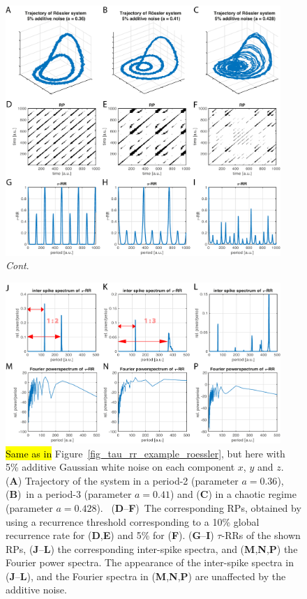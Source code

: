 \documentclass[entropy,article,accept,pdftex,moreauthors]{Definitions/mdpi}
\begin{document}
\begin{figure}[H]
 \includegraphics[width=0.93\textwidth]{./figures/A3A}
 
 \caption{\textit{Cont}.}
\label{fig:petit3leaks3D}
\end{figure}

\begin{figure}[H]\ContinuedFloat

 \includegraphics[width=0.93\textwidth]{./figures/A3B}
 \caption{\hl{Same as in} %
 Figure~\ref{fig_tau_rr_example_roessler}, but here with 5\% additive Gaussian white noise on each component $x$, $y$ and $z$. 
 (\textbf{A}) Trajectory of the system in a period-2 (parameter $a=0.36$), (\textbf{B})~in a period-3 (parameter $a=0.41$) and 
 (\textbf{C}) in a chaotic regime (parameter $a=0.428$). 
\mbox{ (\textbf{D}--\textbf{F})}~The corresponding RPs, obtained by using a recurrence threshold corresponding to a 10\% global 
 recurrence rate for (\textbf{D},\textbf{E}) and 5\% for (\textbf{F}). 
  (\textbf{G}--\textbf{I}) $\tau$-RRs of the shown RPs, 
  (\textbf{J}--\textbf{L}) the corresponding inter-spike spectra, and
  (\textbf{M},\textbf{N},\textbf{P}) the Fourier power spectra. 
 The appearance of the inter-spike spectra 
 in (\textbf{J}--\textbf{L}), and the Fourier spectra in (\textbf{M},\textbf{N},\textbf{P}) are unaffected by the additive noise.}
\label{fig_tau_rr_example_roessler_noise}
\end{figure}
\end{document}
